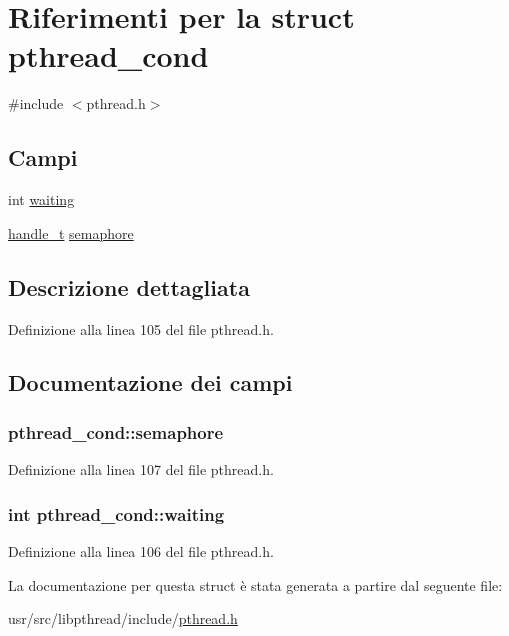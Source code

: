 \hypertarget{structpthread__cond}{\section{Riferimenti per la struct pthread\+\_\+cond}
\label{structpthread__cond}
}


{\ttfamily \#include $<$pthread.\+h$>$}

\subsection*{Campi}
\begin{DoxyCompactItemize}
\item 
int \hyperlink{structpthread__cond_a37ab813587afbb6cfc356963c7960776}{waiting}
\item 
\hyperlink{pthread_8h_aea4188cfb1472f9bb606fd2566133e34}{handle\+\_\+t} \hyperlink{structpthread__cond_add81721af4853baaa6a8f13733a527cc}{semaphore}
\end{DoxyCompactItemize}


\subsection{Descrizione dettagliata}


Definizione alla linea 105 del file pthread.\+h.



\subsection{Documentazione dei campi}
\hypertarget{structpthread__cond_add81721af4853baaa6a8f13733a527cc}{
\subsubsection[{semaphore}]{ pthread\+\_\+cond\+::semaphore}}\label{structpthread__cond_add81721af4853baaa6a8f13733a527cc}


Definizione alla linea 107 del file pthread.\+h.

\hypertarget{structpthread__cond_a37ab813587afbb6cfc356963c7960776}{
\subsubsection[{waiting}]{\setlength{\rightskip}{0pt plus 5cm}int pthread\+\_\+cond\+::waiting}}\label{structpthread__cond_a37ab813587afbb6cfc356963c7960776}


Definizione alla linea 106 del file pthread.\+h.



La documentazione per questa struct è stata generata a partire dal seguente file\+:\begin{DoxyCompactItemize}
\item 
usr/src/libpthread/include/\hyperlink{pthread_8h}{pthread.\+h}\end{DoxyCompactItemize}
